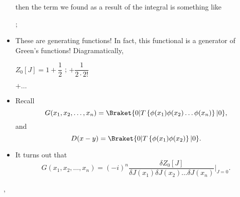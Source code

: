 \begin{itemize}
        then the term we found as a result of the integral is something like

        \begin{center}
        ;
        \end{center}
        
    \item These are generating functions! In fact, this functional is a generator of Green's functions! Diagramatically,
        \begin{center}
            $Z_0[J] = 1 + \dfrac{1}{2}$
                ;
             $+ \dfrac{1}{2 \cdot 2!}$ 
             $+ \ldots$
        \end{center}
    \item Recall
        \begin{equation}
            G(x_1,x_2,\ldots,x_n) = \Braket{0 | T\left\{ \phi(x_1)\phi(x_2)\ldots\phi(x_n) \right\} | 0},
        \end{equation}
        and
        \begin{equation}
            D(x-y) = \Braket{0 | T\left\{ \phi(x_1)\phi(x_2) \right\} | 0}.
        \end{equation}
    \item It turns out that 
        \begin{equation}
            G(x_1,x_2,\ldots,x_n) = (-i)^n \frac{\delta Z_0[J]}{\delta J(x_1) \delta J(x_2) \ldots \delta J(x_n)}\bigg|_{J=0}.\label{eq:CH12-FuncDerivGreensFunc}
        \end{equation}
\end{itemize}

\sep 


